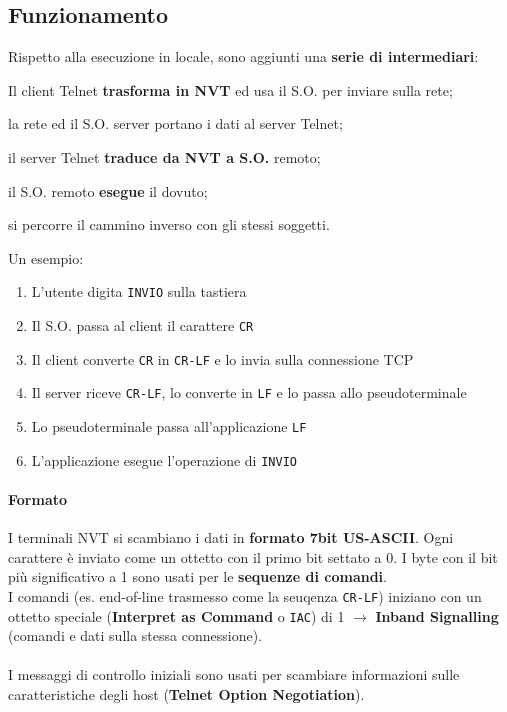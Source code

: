 \documentclass[10pt]{article}
\begin{document}
\subsection{Funzionamento}
Rispetto alla esecuzione in locale, sono aggiunti una \textbf{serie di intermediari}:
\begin{list}{}{}
\item Il client Telnet \textbf{trasforma in NVT} ed usa il S.O. per inviare sulla rete;
\item la rete ed il S.O. server portano i dati al server Telnet;
\item il server Telnet \textbf{traduce da NVT a S.O.} remoto;
\item il S.O. remoto \textbf{esegue} il dovuto;
\item si percorre il cammino inverso con gli stessi soggetti.
\end{list}
Un esempio:
\begin{enumerate}
\item L'utente digita \texttt{INVIO} sulla tastiera
\item Il S.O. passa al client il carattere \texttt{CR}
\item Il client converte \texttt{CR} in \texttt{CR-LF} e lo invia sulla connessione TCP
\item Il server riceve \texttt{CR-LF}, lo converte in \texttt{LF} e lo passa allo pseudoterminale
\item Lo pseudoterminale passa all'applicazione \texttt{LF}
\item L'applicazione esegue l'operazione di \texttt{INVIO}
\end{enumerate}
\paragraph{Formato} I terminali NVT si scambiano i dati in \textbf{formato 7bit US-ASCII}. Ogni carattere è inviato come un ottetto con il primo bit settato a 0. I byte con il bit più significativo a 1 sono usati per le \textbf{sequenze di comandi}.\\
I comandi (es. end-of-line trasmesso come la seuqenza \texttt{CR-LF}) iniziano con un ottetto speciale (\textbf{Interpret as Command} o \texttt{IAC}) di 1 $\rightarrow$ \textbf{Inband Signalling} (comandi e dati sulla stessa connessione).\\\\
I messaggi di controllo iniziali sono usati per scambiare informazioni sulle caratteristiche degli host (\textbf{Telnet  Option Negotiation}).\\
\end{document}
